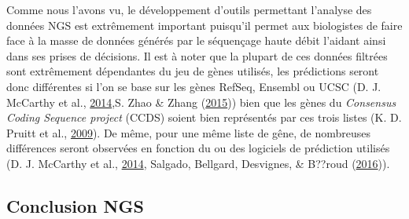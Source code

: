 \documentclass[12pt,twoside]{reedthesis}
\theoremstyle{definition}
\theoremstyle{definition}
\theoremstyle{remark}
\begin{document}
  Comme nous l'avons vu, le développement d'outils permettant l'analyse
  des données NGS est extrêmement important puisqu'il permet aux
  biologistes de faire face à la masse de données générés par le
  séquençage haute débit l'aidant ainsi dans ses prises de décisions. Il
  est à noter que la plupart de ces données filtrées sont extrêmement
  dépendantes du jeu de gènes utilisés, les prédictions seront donc
  différentes si l'on se base sur les gènes RefSeq, Ensembl ou UCSC (D. J.
  McCarthy et al., \protect\hyperlink{ref-McCarthy2014}{2014},S. Zhao \&
  Zhang (\protect\hyperlink{ref-Zhao2015}{2015})) bien que les gènes du
  \emph{Consensus Coding Sequence project} (CCDS) soient bien représentés
  par ces trois listes (K. D. Pruitt et al.,
  \protect\hyperlink{ref-Pruitt2009}{2009}). De même, pour une même liste
  de gêne, de nombreuses différences seront observées en fonction du ou
  des logiciels de prédiction utilisés (D. J. McCarthy et al.,
  \protect\hyperlink{ref-McCarthy2014}{2014}, Salgado, Bellgard,
  Desvignes, \& B??roud (\protect\hyperlink{ref-Salgado2016}{2016})).
  
  \newpage
  
  \subsection{Conclusion NGS}\label{conclusion-ngs}
  
\end{document}

